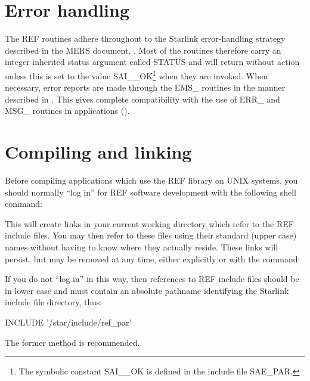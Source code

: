 \documentclass[twoside,11pt,nolof]{starlink}
\begin{document}
\section{Error handling}
\label{error_handling}

The REF routines adhere throughout to the Starlink error-handling
strategy described in the MERS document, .  Most of the routines
therefore carry an integer inherited status argument called STATUS and
will return without action unless this is set to the value
SAI\_\_OK\footnote{The symbolic constant SAI\_\_OK is defined in the
include file SAE\_PAR.} when they are invoked. When necessary, error
reports are made through the EMS\_ routines in the manner described in
.  This gives complete compatibility with the use
of ERR\_ and MSG\_ routines in applications
().

\section{Compiling and linking}
\label{compiling_and_linking}

Before compiling applications which use the REF library on UNIX
systems, you should normally ``log in'' for REF software development
with the following shell command:

\begin{terminalv}
\end{terminalv}

This will create links in your current working directory which refer to
the REF include files. You may then refer to these files using their
standard (upper case) names without having to know where they actually
reside. These links will persist, but may be removed at any time,
either explicitly or with the command:

\begin{terminalv}
\end{terminalv}

If you do not ``log in'' in this way, then references to REF include files
should be in lower case and must contain an absolute pathname identifying the
Starlink include file directory, thus:

\begin{terminalv}
INCLUDE '/star/include/ref_par'
\end{terminalv}

The former method is recommended.
\end{document}
